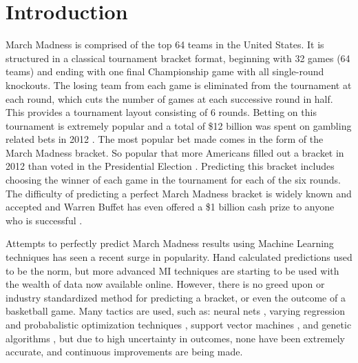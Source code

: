 \documentclass[conference]{IEEEtran}
\begin{document}
\section{Introduction}
March Madness is comprised of the top 64 teams in the United States.
It is structured in a classical tournament bracket format, beginning with 32 games (64 teams) and ending with one final Championship game with all single-round knockouts.
The losing team from each game is eliminated from the tournament at each round, which cuts the number of games at each successive round in half.
This provides a tournament layout consisting of 6 rounds.
Betting on this tournament is extremely popular and a total of \$12 billion was spent on gambling related bets in 2012 \cite{BradTuttle-2012}. 
The most popular bet made comes in the form of the March Madness bracket. So popular that more Americans filled out a bracket in 2012 than voted in the Presidential Election \cite{DavidHolmes-2013}. 
Predicting this bracket includes choosing the winner of each game in the tournament for each of the six rounds. 
The difficulty of predicting a perfect March Madness bracket is widely known and accepted and Warren Buffet has even offered a \$1 billion cash prize to anyone who is successful \cite{wbuff_bill}.

Attempts to perfectly predict March Madness results using Machine Learning techniques has seen a recent surge in popularity. 
Hand calculated predictions used to be the norm, but more advanced MI techniques are starting to be used with the wealth of data now available online. 
However, there is no greed upon or industry standardized method for predicting a bracket, or even the outcome of a basketball game. 
Many tactics are used, such as: neural nets \cite{KarlLeswing}, varying regression and probabalistic optimization techniques \cite{adams-dahl-murray-2010a, DannyTarlow, BradyWest, BradleyCarlin, ProbModelsNCAA-1991, MoreProbModelsNCAA-1996}, support vector machines \cite{KennethDeakins}, and genetic algorithms \cite{ScottTurner}, but due to high uncertainty in outcomes, none have been extremely accurate, and continuous improvements are being made.
\end{document}
